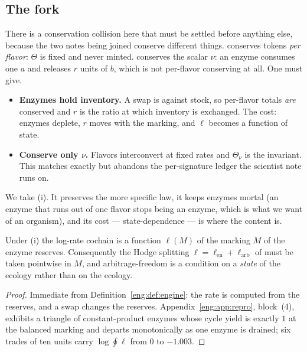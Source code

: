 \subsection{The fork}\label{eng:S3.2}

There is a conservation collision here that must be settled before
anything else, because the two notes being joined conserve different
things. \chComp conserves tokens \emph{per flavor}: $\Theta$ is
fixed and never minted. \cite{vtok} conserves the scalar $\nu$: an enzyme
consumes one $a$ and releases $r$ units of $b$, which is not per-flavor
conserving at all. One must give.

\begin{itemize}[itemsep=3pt]
\item[(i)] \textbf{Enzymes hold inventory.} A swap is against stock, so
per-flavor totals \emph{are} conserved and $r$ is the ratio at which
inventory is exchanged. The cost: enzymes deplete, $r$ moves with the
marking, and $\ell$ becomes a function of state.
\item[(ii)] \textbf{Conserve only $\nu$.} Flavors interconvert at fixed
rates and $\Theta_\nu$ is the invariant. This matches \cite{vtok} exactly
but abandons the per-signature ledger the scientist note runs on.
\end{itemize}

We take (i). It preserves the more specific law, it keeps enzymes mortal
(an enzyme that runs out of one flavor stops being an enzyme, which is what
we want of an organism), and its cost --- state-dependence --- is where the
content is.

\begin{proposition}\label{eng:prop:marking}
Under (i) the log-rate cochain is a function $\ell(M)$ of the marking $M$
of the enzyme reserves. Consequently the Hodge splitting
$\ell = \ell_{\mathrm{en}} + \ell_{\mathrm{arb}}$ of \cite[\S4]{vtok} must
be taken pointwise in $M$, and arbitrage-freedom is a condition on a
\emph{state} of the ecology rather than on the ecology.
\end{proposition}

\begin{proof}
Immediate from Definition~\ref{eng:def:engine}: the rate is computed from the
reserves, and a swap changes the reserves. Appendix~\ref{eng:app:repro},
block~(4), exhibits a triangle of constant-product enzymes whose cycle
yield is exactly $1$ at the balanced marking and departs monotonically as
one enzyme is drained; six trades of ten units carry
$\log \oint \ell$ from $0$ to $-1.003$.
\end{proof}

